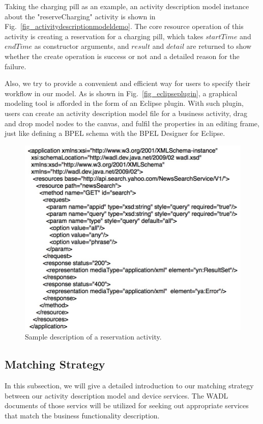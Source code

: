 Taking the charging pill as an example, an activity description model instance about the "reserveCharging" activity is shown in Fig.~\ref{fig_activitydescriptionmodeldemo}. The core resource operation of this activity is creating a reservation for a charging pill, which takes $startTime$ and $endTime$ as constructor arguments, and $result$ and $detail$ are returned to show whether the create operation is success or not and a detailed reason for the failure. 

Also, we try to provide a convenient and efficient way for users to specify their workflow in our model. As is shown in Fig.~\ref{fig_eclipseplugin}, a graphical modeling tool is afforded in the form of an Eclipse plugin. With such plugin, users can create an activity description model file for a business activity, drag and drop model nodes to the canvas, and fulfil the properties in an editing frame, just like defining a BPEL schema with the BPEL Designer for Eclipse. 

\begin{figure}[!t]
\centering
\includegraphics[width=1.0\linewidth]{./graph/wadl}
\caption{Sample description of a reservation activity.}
\label{fig_wadl}
\end{figure}

\subsection{Matching Strategy}
In this subsection, we will give a detailed introduction to our matching strategy between our activity description model and device services. The WADL documents of those servics will be 
utilized for seeking out appropriate services that match the business functionality description. 

